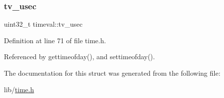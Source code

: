 \mbox{\label{structtimeval_a8fd7abf5420981b3ff58bb23df458587}} 
\subsubsection{\texorpdfstring{tv\+\_\+usec}{tv\_usec}}
{\footnotesize\ttfamily uint32\+\_\+t timeval\+::tv\+\_\+usec}



Definition at line 71 of file time.\+h.



Referenced by gettimeofday(), and settimeofday().



The documentation for this struct was generated from the following file\+:\begin{DoxyCompactItemize}
\item 
lib/\hyperlink{time_8h}{time.\+h}\end{DoxyCompactItemize}
